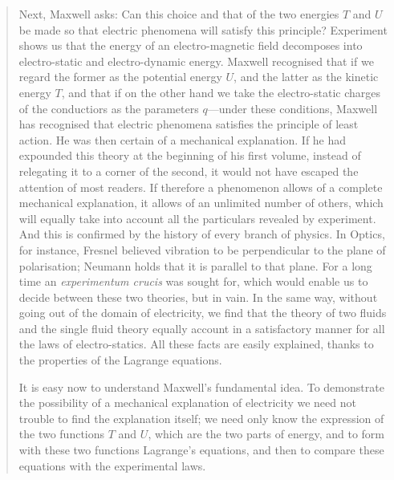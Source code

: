 \documentclass{article}
\begin{document}
\begin{quote}
    Next, Maxwell asks: Can this choice and that of the two energies $T$ and $U$ be made so that electric phenomena will satisfy this principle?  Experiment shows us that the energy of an electro-magnetic field decomposes into electro-static and electro-dynamic energy.  Maxwell recognised that if we regard the former as the potential energy $U$, and the latter as the kinetic energy $T$, and that if on the other hand we take the electro-static charges of the conductiors as the parameters $q$---under these conditions, Maxwell has recognised that electric phenomena satisfies the principle of least action.  He was then certain of a mechanical explanation.  If he had expounded this theory at the beginning of his first volume, instead of relegating it to a corner of the second, it would not have escaped the attention of most readers.  If therefore a phenomenon allows of a complete mechanical explanation, it allows of an unlimited number of others, which will equally take into account all the particulars revealed by experiment.  And this is confirmed by the history of every branch of physics.  In Optics, for instance, Fresnel believed vibration to be perpendicular to the plane of polarisation; Neumann holds that it is parallel to that plane.  For a long time an \emph{experimentum crucis} was sought for, which would enable us to decide between these two theories, but in vain.  In the same way, without going out of the domain of electricity, we find that the theory of two fluids and the single fluid theory equally account in a satisfactory manner for all the laws of electro-statics.  All these facts are easily explained, thanks to the properties of the Lagrange equations.
    
    It is easy now to understand Maxwell's fundamental idea.  To demonstrate the possibility of a mechanical explanation of electricity we need not trouble to find the explanation itself; we need only know the expression of the two functions $T$ and $U$, which are the two parts of energy, and to form with these two functions Lagrange's equations, and then to compare these equations with the experimental laws.
    

\end{quote}
\end{document}
